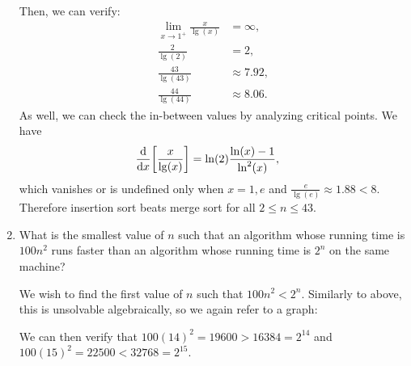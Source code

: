 \documentclass[Chapter01]{subfiles}
\begin{document}
\begin{enumerate}[leftmargin=\labelsep]
\begin{answer}
			Then, we can verify:
			\begin{align*}
				\lim_{x \to 1^+} \frac{x}{\lg(x)} &= \infty,\\
				\frac{2}{\lg(2)} &= 2,\\
				\frac{43}{\lg(43)} &\approx 7.92,\\
				\frac{44}{\lg(44)} &\approx 8.06.
			\end{align*}
			As well, we can check the in-between values by analyzing critical points. We have
			\begin{align*}
				\dv{}{x} \qty[\frac{x}{\lg(x)}] &= \ln(2)\frac{\ln(x) - 1}{\ln^2(x)},
			\end{align*}
			which vanishes or is undefined only when $x = 1,e$ and $\frac{e}{\lg(e)} \approx 1.88 < 8$. Therefore insertion sort beats merge sort for all $2 \leq n \leq 43$.
		\end{answer}

		\item What is the smallest value of $n$ such that an algorithm whose running time is $100n^2$ runs faster than an algorithm whose running time is $2^n$ on the same machine?
		\begin{answer}
			We wish to find the first value of $n$ such that $100n^2 < 2^n$. Similarly to above, this is unsolvable algebraically, so we again refer to a graph:\\

			\begin{figure}[h]
				\centering
			\end{figure}

			We can then verify that $100(14)^2 = \num{19600} > \num{16384} = 2^{14}$ and $100(15)^2 = \num{22500} < \num{32768} = 2^{15}$.
		\end{answer}
	\end{enumerate}
\end{document}
